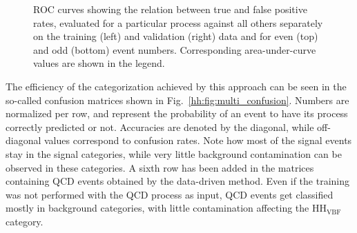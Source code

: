 \documentclass[../main.tex]{subfiles}
\begin{document}
\begin{figure}[h!]
\begin{center}
\end{center}
\caption{ROC curves showing the relation between true and false positive rates, evaluated for a particular process against all others separately on the training (left) and validation (right) data and for even (top) and odd (bottom) event numbers. Corresponding area-under-curve values are shown in the legend.}
\label{hh:fig:multi_roc}
\end{figure}

The efficiency of the categorization achieved by this approach can be seen in the so-called confusion matrices shown in Fig.~\ref{hh:fig:multi_confusion}. Numbers are normalized per row, and represent the probability of an event to have its process correctly predicted or not. Accuracies are denoted by the diagonal, while off-diagonal values correspond to confusion rates. Note how most of the signal events stay in the signal categories, while very little background contamination can be observed in these categories. A sixth row has been added in the matrices containing QCD events obtained by the data-driven method. Even if the training was not performed with the QCD process as input, QCD events get classified mostly in background categories, with little contamination affecting the HH${}_\text{VBF}$ category.
\end{document}
